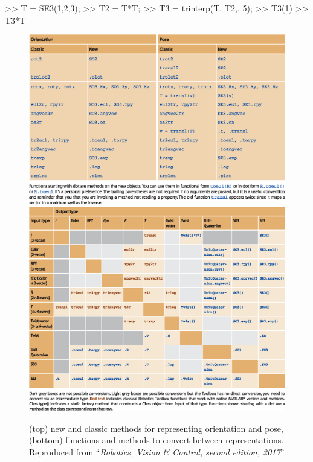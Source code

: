 \documentclass[a4paper,twoside]{report}
\begin{document}
\begin{Code}
>> T = SE3(1,2,3);  %
>> T2 = T*T;  %
>> T3 = trinterp(T, T2,, 5); %
>> T3(1)  %
>> T3*T  %
\end{Code}

\begin{figure}[p]
\centering
\includegraphics[width=\textwidth]{figs/CT-02-03.eps}
\includegraphics[width=\textwidth]{figs/CT-02-02.eps}
\caption{(top) new and classic methods for representing orientation and pose, (bottom) functions and methods to convert
between representations.  Reproduced from ``\textit{Robotics, Vision \& Control, second edition, 2017}''}\label{fig:newfunctions}
\end{figure}
\end{document}
